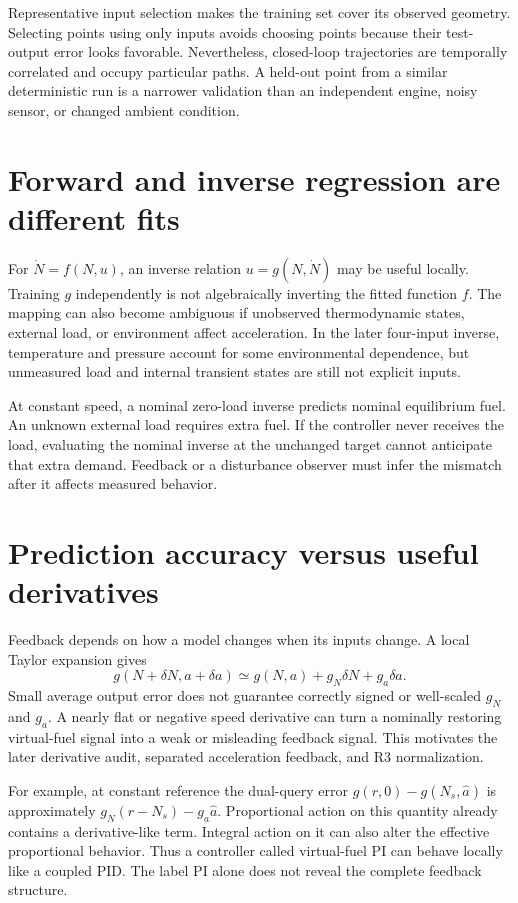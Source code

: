 Representative input selection makes the training set cover its observed geometry. Selecting points using only inputs avoids choosing points because their test-output error looks favorable. Nevertheless, closed-loop trajectories are temporally correlated and occupy particular paths. A held-out point from a similar deterministic run is a narrower validation than an independent engine, noisy sensor, or changed ambient condition.

\section{Forward and inverse regression are different fits}
For $\dot N=f(N,u)$, an inverse relation $u=g(N,\dot N)$ may be useful locally. Training $g$ independently is not algebraically inverting the fitted function $f$. The mapping can also become ambiguous if unobserved thermodynamic states, external load, or environment affect acceleration. In the later four-input inverse, temperature and pressure account for some environmental dependence, but unmeasured load and internal transient states are still not explicit inputs.

At constant speed, a nominal zero-load inverse predicts nominal equilibrium fuel. An unknown external load requires extra fuel. If the controller never receives the load, evaluating the nominal inverse at the unchanged target cannot anticipate that extra demand. Feedback or a disturbance observer must infer the mismatch after it affects measured behavior.

\section{Prediction accuracy versus useful derivatives}
Feedback depends on how a model changes when its inputs change. A local Taylor expansion gives
\begin{equation}g(N+\delta N,a+\delta a)\simeq g(N,a)+g_N\delta N+g_a\delta a.
\end{equation}
Small average output error does not guarantee correctly signed or well-scaled $g_N$ and $g_a$. A nearly flat or negative speed derivative can turn a nominally restoring virtual-fuel signal into a weak or misleading feedback signal. This motivates the later derivative audit, separated acceleration feedback, and R3 normalization.

For example, at constant reference the dual-query error $g(r,0)-g(N_s,\hat a)$ is approximately $g_N(r-N_s)-g_a\hat a$. Proportional action on this quantity already contains a derivative-like term. Integral action on it can also alter the effective proportional behavior. Thus a controller called virtual-fuel PI can behave locally like a coupled PID. The label PI alone does not reveal the complete feedback structure.

